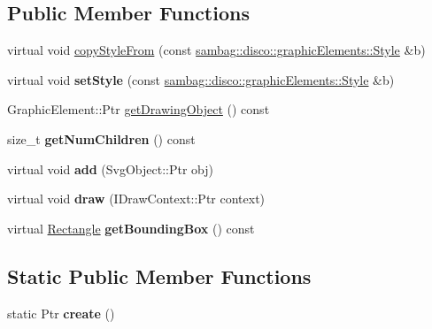 \subsection*{Public Member Functions}
\begin{DoxyCompactItemize}
\item 
virtual void \hyperlink{classsambag_1_1disco_1_1svg_1_1_svg_compound_afd816234932cc473e71799defc511b93}{copyStyleFrom} (const \hyperlink{classsambag_1_1disco_1_1graphic_elements_1_1_style}{sambag::disco::graphicElements::Style} \&b)
\item 
\hypertarget{classsambag_1_1disco_1_1svg_1_1_svg_compound_abf2ed04d2056cc23f2bd18e733a37010}{
virtual void {\bfseries setStyle} (const \hyperlink{classsambag_1_1disco_1_1graphic_elements_1_1_style}{sambag::disco::graphicElements::Style} \&b)}
\label{classsambag_1_1disco_1_1svg_1_1_svg_compound_abf2ed04d2056cc23f2bd18e733a37010}

\item 
GraphicElement::Ptr \hyperlink{classsambag_1_1disco_1_1svg_1_1_svg_compound_a3f778dfdf91a6b6a7fcd8065708e132d}{getDrawingObject} () const 
\item 
\hypertarget{classsambag_1_1disco_1_1svg_1_1_svg_compound_ab97cedaf15e20a3dbe8530e0baf95d43}{
size\_\-t {\bfseries getNumChildren} () const }
\label{classsambag_1_1disco_1_1svg_1_1_svg_compound_ab97cedaf15e20a3dbe8530e0baf95d43}

\item 
\hypertarget{classsambag_1_1disco_1_1svg_1_1_svg_compound_adea06ff47c94f6ef3dfafa09e63c6df5}{
virtual void {\bfseries add} (SvgObject::Ptr obj)}
\label{classsambag_1_1disco_1_1svg_1_1_svg_compound_adea06ff47c94f6ef3dfafa09e63c6df5}

\item 
\hypertarget{classsambag_1_1disco_1_1svg_1_1_svg_compound_a8e81a118a56bba814020938288c4dce3}{
virtual void {\bfseries draw} (IDrawContext::Ptr context)}
\label{classsambag_1_1disco_1_1svg_1_1_svg_compound_a8e81a118a56bba814020938288c4dce3}

\item 
\hypertarget{classsambag_1_1disco_1_1svg_1_1_svg_compound_a3a133a2b00b8161750722992ccf8235d}{
virtual \hyperlink{classsambag_1_1com_1_1_rectangle}{Rectangle} {\bfseries getBoundingBox} () const }
\label{classsambag_1_1disco_1_1svg_1_1_svg_compound_a3a133a2b00b8161750722992ccf8235d}

\end{DoxyCompactItemize}
\subsection*{Static Public Member Functions}
\begin{DoxyCompactItemize}
\item 
\hypertarget{classsambag_1_1disco_1_1svg_1_1_svg_compound_ada54b80d89a9f70b36b519cfac1e510e}{
static Ptr {\bfseries create} ()}
\label{classsambag_1_1disco_1_1svg_1_1_svg_compound_ada54b80d89a9f70b36b519cfac1e510e}

\end{DoxyCompactItemize}
